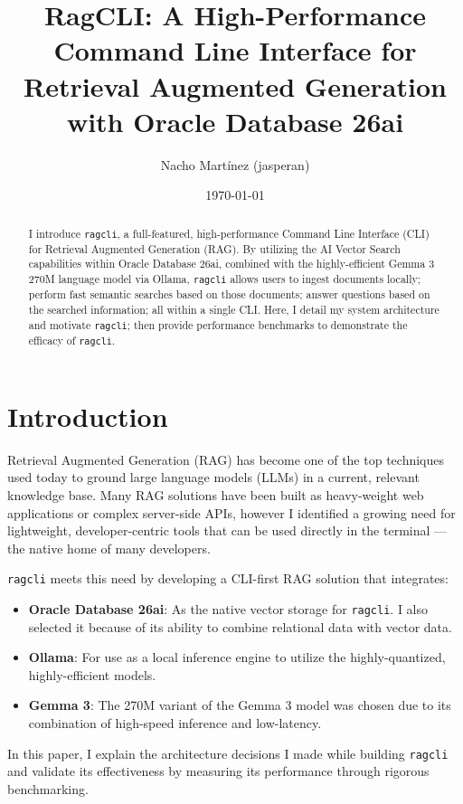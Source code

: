 \documentclass[11pt,a4paper]{article}
\title{\textbf{RagCLI: A High-Performance Command Line Interface for\\Retrieval Augmented Generation with Oracle Database 26ai}}
\author{Nacho Martínez (jasperan)}
\affil{Data Scientist Advocate at Oracle \\ \url{https://github.com/jasperan}}
\date{\today}
\begin{document}
\maketitle

\begin{abstract}
I introduce \texttt{ragcli}, a full-featured, high-performance Command Line Interface (CLI) for Retrieval Augmented Generation (RAG). By utilizing the AI Vector Search capabilities within Oracle Database 26ai, combined with the highly-efficient Gemma 3 270M language model via Ollama, \texttt{ragcli} allows users to ingest documents locally; perform fast semantic searches based on those documents; answer questions based on the searched information; all within a single CLI. 
Here, I detail my system architecture and motivate \texttt{ragcli}; then provide performance benchmarks to demonstrate the efficacy of \texttt{ragcli}.
\end{abstract}

\section{Introduction}

Retrieval Augmented Generation (RAG) has become one of the top techniques used today to ground large language models (LLMs) in a current, relevant knowledge base. Many RAG solutions have been built as heavy-weight web applications or complex server-side APIs, however I identified a growing need for lightweight, developer-centric tools that can be used directly in the terminal — the native home of many developers.

\texttt{ragcli} meets this need by developing a CLI-first RAG solution that integrates:
\begin{itemize}
\item \textbf{Oracle Database 26ai}: As the native vector storage for \texttt{ragcli}. I also selected it because of its ability to combine relational data with vector data.
\item \textbf{Ollama}: For use as a local inference engine to utilize the highly-quantized, highly-efficient models.
\item \textbf{Gemma 3}: The 270M variant of the Gemma 3 model was chosen due to its combination of high-speed inference and low-latency.
\end{itemize}

In this paper, I explain the architecture decisions I made while building \texttt{ragcli} and validate its effectiveness by measuring its performance through rigorous benchmarking.
\end{document}
